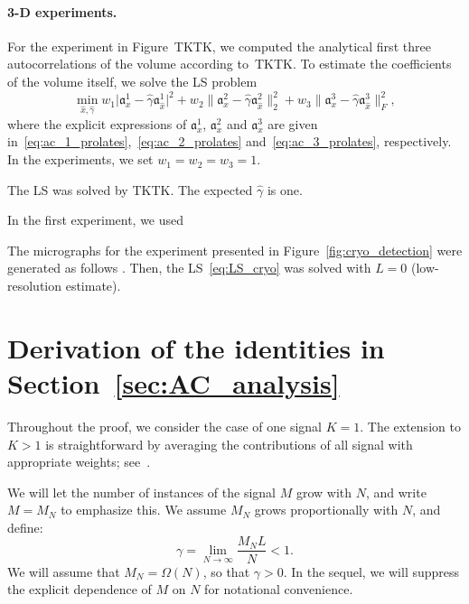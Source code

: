 \documentclass[9pt,twocolumn,twoside,lineno]{pnas-new}
\begin{document}
\paragraph{3-D experiments.}

For the experiment in Figure~TKTK, we computed the analytical first three autocorrelations of the volume according to~TKTK. To estimate the coefficients of the volume itself, we solve the LS problem
\begin{equation} \label{eq:LS_cryo}
\min_{\hat{x},\hat{\gamma}} w_1 \vert \mathfrak{a}_x^1 - \hat{\gamma}\mathfrak{a}_{\hat{x}}^1 \vert^2 + w_2\| \mathfrak{a}_x^2 - \hat{\gamma}\mathfrak{a}_{\hat{x}}^2 \|_2^2 + w_3\| \mathfrak{a}_x^3 - \hat{\gamma}\mathfrak{a}_{\hat{x}}^3 \|_F^2, 
\end{equation}  
where the explicit expressions of $\mathfrak{a}_x^1$, $\mathfrak{a}_x^2$ and $\mathfrak{a}_x^3$ are given in~\eqref{eq:ac_1_prolates},~\eqref{eq:ac_2_prolates} and~\eqref{eq:ac_3_prolates}, respectively.  
In the experiments, we set $w_1=w_2=w_3=1$. 

The LS was solved by TKTK. The expected $\hat \gamma$ is one.

In the first experiment, we used 

The micrographs for the experiment presented in Figure~\ref{fig:cryo_detection} were generated as follows . Then, the LS~\eqref{eq:LS_cryo} was solved with $L=0$ (low-resolution estimate).

\section{Derivation of the identities in Section~\ref{sec:AC_analysis}} \label{sec:autocorrelation_computation}

Throughout the proof, we consider the case of one signal $K=1$. The extension to $K>1$ is straightforward by averaging the contributions of all signal with  appropriate weights; see~\cite{boumal2017heterogeneous}. 

We will let the number of instances of the signal $M$ grow with $N$, and write $M=M_N$ to emphasize this. We assume $M_N$ grows proportionally with $N$, and define:
%
\begin{equation}
\gamma = \lim_{N\to\infty} \frac{M_NL}{N}<1.
\end{equation}
%
We will assume that $M_N=\Omega(N)$, so that $\gamma>0$. In the sequel, we will suppress the explicit dependence of $M$ on $N$ for notational convenience.
\end{document}
